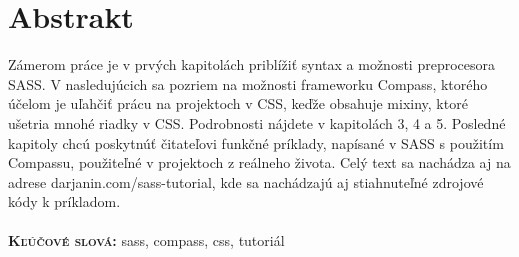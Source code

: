 \chapter*{Abstrakt}
Zámerom práce je v prvých kapitolách priblížiť syntax a možnosti preprocesora SASS. V nasledujúcich sa pozriem na možnosti frameworku Compass, ktorého účelom je uľahčiť prácu na projektoch v CSS, keďže obsahuje mixiny, ktoré ušetria mnohé riadky v CSS. Podrobnosti nájdete v kapitolách 3, 4 a 5. Posledné kapitoly chcú poskytnúť čitateľovi funkčné príklady, napísané v SASS s použitím Compassu, použiteľné v projektoch z reálneho života. Celý text sa nachádza aj na adrese darjanin.com/sass-tutorial, kde sa nachádzajú aj stiahnuteľné zdrojové kódy k príkladom. \\ \\
\textbf{\textsc{Kľúčové slová:}} sass, compass, css, tutoriál
